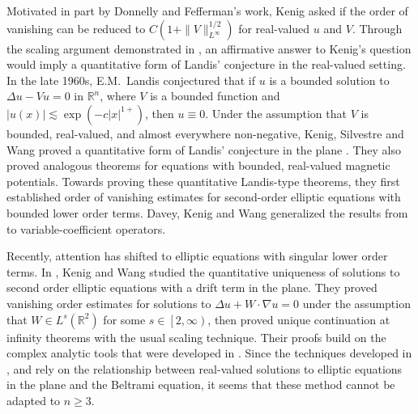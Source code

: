 \documentclass[11pt]{amsart}
\theoremstyle{plain}
\numberwithin{equation}{section}
\begin{document}
Motivated in part by Donnelly and Fefferman's work, Kenig \cite{Ken07} asked if the order of vanishing can be reduced to $C(1+\|V\|_{L^\infty}^{1/2})$ for real-valued $u$ and $V$.
Through the scaling argument demonstrated in \cite{BK05}, an affirmative answer to Kenig's question would imply a quantitative form of Landis' conjecture in the real-valued setting.
In the late 1960s, E.M.~Landis conjectured that if $u$ is a bounded solution to ${\Delta} u - V u = 0$ in ${\ensuremath{\mathbb{R}}}^n$, where $V$ is a bounded function and ${\left\vert{u{\left( {x} \right) }}\right\vert} \lesssim \exp{\left( {- c {\left\vert{x}\right\vert}^{1+}} \right) }$, then $u \equiv 0$.
Under the assumption that $V$ is bounded, real-valued, and almost everywhere non-negative, Kenig, Silvestre and Wang proved a quantitative form of Landis' conjecture in the plane \cite{KSW15}.
They also proved analogous theorems for equations with bounded, real-valued magnetic potentials.
Towards proving these quantitative Landis-type theorems, they first established order of vanishing estimates for second-order elliptic equations with bounded lower order terms.
Davey, Kenig and Wang \cite{DKW16} generalized the results from \cite{KSW15} to variable-coefficient operators.

Recently, attention has shifted to elliptic equations with singular lower order terms.
In \cite{KW15}, Kenig and Wang studied the quantitative uniqueness of solutions to second order elliptic equations with a drift term in the plane.
They proved vanishing order estimates for solutions to ${\Delta} u + W \cdot {\nabla} u = 0$ under the assumption that $W \in L^s{\left( {{\ensuremath{\mathbb{R}}}^2} \right) }$ for some $s \in {\left[ {2, {\infty}} \right) }$, then proved unique continuation at infinity theorems with the usual scaling technique.
Their proofs build on the complex analytic tools that were developed in \cite{KSW15}.
Since the techniques developed in \cite{KSW15}, \cite{KW15} and \cite{DKW16} rely on the relationship between real-valued solutions to elliptic equations in the plane and the Beltrami equation, it seems that these method cannot be adapted to $n\geq 3$.
\end{document}
